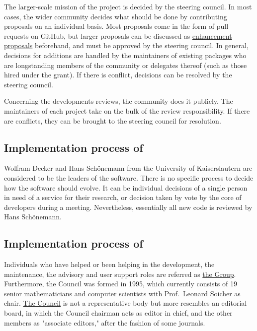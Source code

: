 \documentclass{deliverablereport}
\begin{document}
The larger-scale mission of the project is decided by the steering council. In most cases, the wider \Jupyter community decides what should be done by contributing proposals on an individual basis. Most proposals come in the form of pull requests on GitHub, but larger proposals can be discussed as \href{https://github.com/jupyter/enhancement-proposals}{enhancement proposals} beforehand, and must be approved by the steering council. In general, decisions for additions are handled by the maintainers of existing packages who are longstanding members of the community or delegates thereof (such as those hired under the \ODK grant). If there is conflict, decisions can be resolved by the steering council.

Concerning the developments reviews, the \Jupyter community does it publicly. The maintainers of each project take on the bulk of the review responsibility. If there are conflicts, they can be brought to the steering council for resolution.


\subsection{Implementation process of \Singular}

Wolfram Decker and Hans Schönemann from the University of Kaiserslautern are considered to be the leaders of the \Singular software.
There is no specific process to decide how the software should evolve. It can be individual decisions of a single person in need of a service for their research, or decision taken by vote by the core of \Singular developers during a meeting.
Nevertheless, essentially all new code is reviewed by Hans Schönemann.

\subsection{Implementation process of \GAP}

Individuals who have helped or been helping in the development, the
maintenance, the advisory and user support roles are referred as
\href{https://www.gap-system.org/Contacts/People/people.html}{the \GAP
  Group}.  Furthermore, the \GAP Council was formed in 1995, which
currently consists of 19 senior mathematicians and computer
scientists with Prof.~Leonard Soicher as
chair. \href{https://www.gap-system.org/Contacts/People/Council/council.html}{The
  \GAP Council} is not a representative body but more resembles an
editorial board, in which the Council chairman acts as editor in
chief, and the other members as "associate editors," after
the fashion of some journals.
\end{document}
